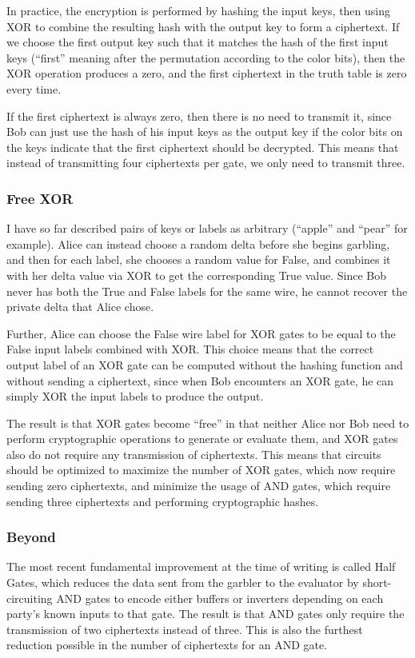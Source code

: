 In practice, the encryption is performed by hashing the input keys, then using XOR to combine the resulting hash with the output key to form a ciphertext. If we choose the first output key such that it matches the hash of the first input keys (``first'' meaning after the permutation according to the color bits), then the XOR operation produces a zero, and the first ciphertext in the truth table is zero every time.

If the first ciphertext is always zero, then there is no need to transmit it, since Bob can just use the hash of his input keys as the output key if the color bits on the keys indicate that the first ciphertext should be decrypted. This means that instead of transmitting four ciphertexts per gate, we only need to transmit three.

\subsubsection{Free XOR}
I have so far described pairs of keys or labels as arbitrary (``apple'' and ``pear'' for example). Alice can instead choose a random delta before she begins garbling, and then for each label, she chooses a random value for False, and combines it with her delta value via XOR to get the corresponding True value. Since Bob never has both the True and False labels for the same wire, he cannot recover the private delta that Alice chose.

Further, Alice can choose the False wire label for XOR gates to be equal to the False input labels combined with XOR. This choice means that the correct output label of an XOR gate can be computed without the hashing function and without sending a ciphertext, since when Bob encounters an XOR gate, he can simply XOR the input labels to produce the output\cite{gentle}.

The result is that XOR gates become ``free'' in that neither Alice nor Bob need to perform cryptographic operations to generate or evaluate them, and XOR gates also do not require any transmission of ciphertexts. This means that circuits should be optimized to maximize the number of XOR gates, which now require sending zero ciphertexts, and minimize the usage of AND gates, which require sending three ciphertexts and performing cryptographic hashes.

\subsubsection{Beyond}
The most recent fundamental improvement at the time of writing is called Half Gates\cite{HalfGates}, which reduces the data sent from the garbler to the evaluator by short-circuiting AND gates to encode either buffers or inverters depending on each party's known inputs to that gate. The result is that AND gates only require the transmission of two ciphertexts instead of three. This is also the furthest reduction possible in the number of ciphertexts for an AND gate\cite{HalfGates}.

